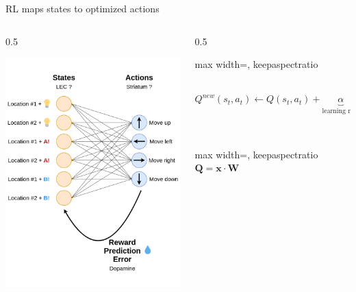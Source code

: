 \documentclass[bigger]{beamer}
\begin{document}
\begin{frame}[label={sec:org2a391de}]{RL maps states to optimized actions}
\begin{columns}
\begin{column}{0.5\columnwidth}
\begin{center}
\includegraphics[height=0.8\textheight]{./img/RL_mapping.drawio.png}
\end{center}
\end{column}
\begin{column}{0.5\columnwidth}
\begin{adjustbox}{max width=\columnwidth, keepaspectratio}
\( Q^{new}(s_t, a_t) \longleftarrow Q(s_t, a_t) + \underbrace{\alpha}_\text{learning rate}\overbrace{(\underbrace{r_t}_\text{reward} + \gamma \operatorname*{max}_a Q(s_{t+1, a}) - Q(s_t, a_t))}^\text{temporal difference} \)
\end{adjustbox}\\[1em]
\begin{adjustbox}{max width=\columnwidth, keepaspectratio}
\( \mathbf{Q} = \mathrm{\mathbf{x}} \cdot \mathbf{W} \)
\end{adjustbox}
\end{column}
\end{columns}
\end{frame}
\end{document}
